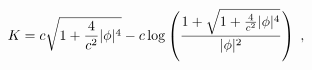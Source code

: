 \begin{equation}
 K = c\sqrt{1 + {4\over c^2} |\phi|^4} 
   - c\log\left( {1 + \sqrt{1 + {4\over c^2} |\phi|^4} 
                 \over |\phi|^2 } \right) \;,
\end{equation} 
